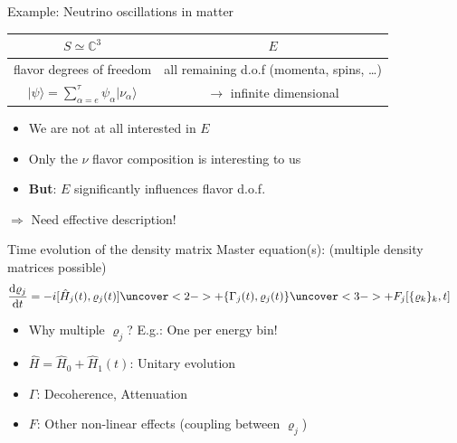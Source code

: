 \documentclass[]{beamer}
\begin{document}
\begin{frame}{Example: Neutrino oscillations in matter}
  \begin{center}
    \begin{tabular}[t]{c|c}
      \(S \simeq \mathbb{C}^3\) & \(E\) \\
      \toprule
      flavor degrees of freedom & all remaining d.o.f (momenta, spins, \ldots) \\
      \(\vert \psi \rangle = \sum_{\alpha = e}^{\tau}\psi_\alpha \vert \nu_\alpha \rangle \) & \(\rightarrow\) infinite dimensional 
    \end{tabular}
  \end{center}
  \vspace{0.5cm}
  \begin{itemize}
    \item We are not at all interested in \(E\)
    \item Only the \(\nu\) flavor composition is interesting to us 
    \item \textbf{But}: \(E\) significantly influences flavor d.o.f.
  \end{itemize}
  \(\Rightarrow\) Need effective description!
\end{frame}

\begin{frame}{Time evolution of the density matrix}
  Master equation(s): (multiple density matrices possible)
  \begin{align*}
    \frac{\mathrm{d}\varrho_j}{\mathrm{d}t} &= -i [\hat{H}_j(t), \varrho_j(t)] \uncover<2->{+ \{\Gamma_j(t), \varrho_j(t)\}} \uncover<3->{+ F_j[\{\varrho_k\}_k, t]}
  \end{align*}
  \begin{itemize}
    \item<1-> Why multiple \(\varrho_j\)? E.g.: One per energy bin!
    \item<1-> \(\hat{H} = \hat{H}_0 + \hat{H}_1(t)\): Unitary evolution
    \item<2-> \(\Gamma\): Decoherence, Attenuation
    \item<3-> \(F\): Other non-linear effects (coupling between \(\varrho_j\))
  \end{itemize}
\end{frame}
\end{document}
